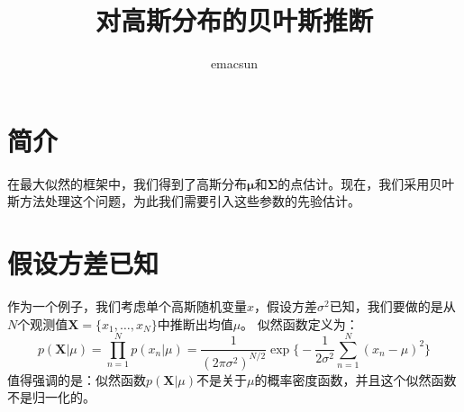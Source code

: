 \documentclass[10pt,a4paper,UTF8]{article}
\author{emacsun}
\date{}
\title{对高斯分布的贝叶斯推断}
\begin{document}
\maketitle
\tableofcontents
{}

\section{简介}
\label{sec:orgac27809}


在最大似然的框架中，我们得到了高斯分布\(\mathbf{\mu}\)和\(\mathbf{\Sigma}\)的点估计。现在，我们采用贝叶斯方法处理这个问题，为此我们需要引入这些参数的先验估计。
\section{假设方差已知}
\label{sec:org0695438}


作为一个例子，我们考虑单个高斯随机变量\(x\)，假设方差\(\sigma^{2}\)已知，我们要做的是从\(N\)个观测值\(\mathbf{X} = \{x_{1},\ldots ,x_{N}\}\)中推断出均值\(\mu\)。 似然函数定义为：
\begin{equation}
\label{eq:1}
p(\mathbf{X}|\mu) = \prod_{n=1}^{N}p(x_{n}|\mu) = \frac{1}{(2\pi\sigma^{2})^{N/2}}\exp\bigg\{-\frac{1}{2\sigma^{2}} \sum_{n=1}^{N}(x_{n}-\mu)^{2}\bigg\}
\end{equation}
值得强调的是：似然函数\(p(\mathbf{X}|\mu)\)不是关于\(\mu\)的概率密度函数，并且这个似然函数不是归一化的。
\end{document}
